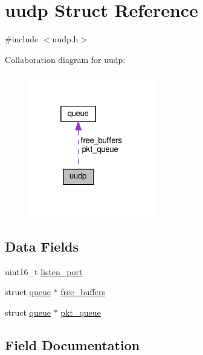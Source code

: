 \hypertarget{structuudp}{}\section{uudp Struct Reference}
\label{structuudp}


{\ttfamily \#include $<$uudp.\+h$>$}



Collaboration diagram for uudp\+:\nopagebreak
\begin{figure}[H]
\begin{center}
\leavevmode
\includegraphics[width=157pt]{structuudp__coll__graph}
\end{center}
\end{figure}
\subsection*{Data Fields}
\begin{DoxyCompactItemize}
\item 
uint16\+\_\+t \hyperlink{structuudp_a00e34c9d365186d751ac02d8fd8fb130}{listen\+\_\+port}
\item 
struct \hyperlink{structqueue}{queue} $\ast$ \hyperlink{structuudp_a82b920ae77d6f50adebe104fde7bd372}{free\+\_\+buffers}
\item 
struct \hyperlink{structqueue}{queue} $\ast$ \hyperlink{structuudp_a173d6e92d93ed6c5a8e6bae66a66c132}{pkt\+\_\+queue}
\end{DoxyCompactItemize}


\subsection{Field Documentation}
\mbox{\label{structuudp_a82b920ae77d6f50adebe104fde7bd372}} 
